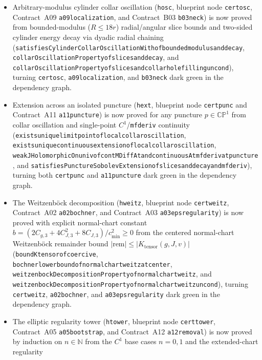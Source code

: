 \documentclass[11pt]{article}
\renewcommand{\_}{\origus\allowbreak}
\newcommand{\CP}{\mathbb{CP}^1}
\newcommand{\code}[1]{\texttt{#1}}
\begin{document}
\begin{itemize}
  \code{a10\_decay} dark green in the dependency graph.
\item Arbitrary-modulus cylinder collar oscillation (\code{h\_osc}, blueprint node \code{cert\_osc},
  Contract~A09 \code{a09\_localization}, and Contract~B03 \code{b03\_neck}) is now proved from
  bounded-modulus ($R\le 18r$) radial/angular slice bounds and two-sided cylinder energy decay via
  dyadic radial chaining (\code{satisfiesCylinderCollarOscillationWith\_of\_bounded\_modulus\_and\_decay},
  \code{collarOscillationProperty\_of\_slices\_and\_decay}, and
  \code{collarOscillationProperty\_of\_slices\_and\_collar\_hole\_filling\_uncond}), turning
  \code{cert\_osc}, \code{a09\_localization}, and \code{b03\_neck} dark green in the dependency graph.
\item Extension across an isolated puncture (\code{h\_ext}, blueprint node \code{cert\_punc} and
  Contract~A11 \code{a11\_puncture}) is now proved for any puncture $p\in\CP$ from collar oscillation
  and single-point $C^1$/\code{mfderiv} continuity (\code{exists\_unique\_limit\_point\_of\_local\_collar\_oscillation},
  \code{exists\_unique\_continuous\_extension\_of\_local\_collar\_oscillation},
  \code{weakJHolomorphicOn\_univ\_of\_contMDiffAt\_and\_continuousAt\_mfderiv\_at\_puncture}, and
  \code{satisfiesPunctureSobolevExtension\_of\_slices\_and\_decay\_and\_mfderiv}), turning both
  \code{cert\_punc} and \code{a11\_puncture} dark green in the dependency graph.
\item The Weitzenb\"ock decomposition (\code{h\_weitz}, blueprint node \code{cert\_weitz},
  Contract~A02 \code{a02\_bochner}, and Contract~A03 \code{a03\_eps\_regularity}) is now proved with
  explicit normal-chart constant $b=(2C_{g,3}+4C_{J,3}^2+8C_{J,3})/c_{\min}^2\ge0$ from the centered
  normal-chart Weitzenb\"ock remainder bound $|\mathrm{rem}|\le|K_{\mathrm{tensor}}(g,J,v)|$
  (\code{bound\_K\_tensor\_of\_coercive}, \code{bochner\_lower\_bound\_of\_normal\_chart\_weitz\_at\_center},
  \code{weitzenbockDecompositionProperty\_of\_normal\_chart\_weitz}, and
  \code{weitzenbockDecompositionProperty\_of\_normal\_chart\_weitz\_uncond}), turning
  \code{cert\_weitz}, \code{a02\_bochner}, and \code{a03\_eps\_regularity} dark green in the
  dependency graph.
\item The elliptic regularity tower (\code{h\_tower}, blueprint node \code{cert\_tower},
  Contract~A05 \code{a05\_bootstrap}, and Contract~A12 \code{a12\_removal}) is now proved by
  induction on $n\in\mathbb{N}$ from the $C^1$ base cases $n=0,1$ and the extended-chart regularity

\end{itemize}
\end{document}
